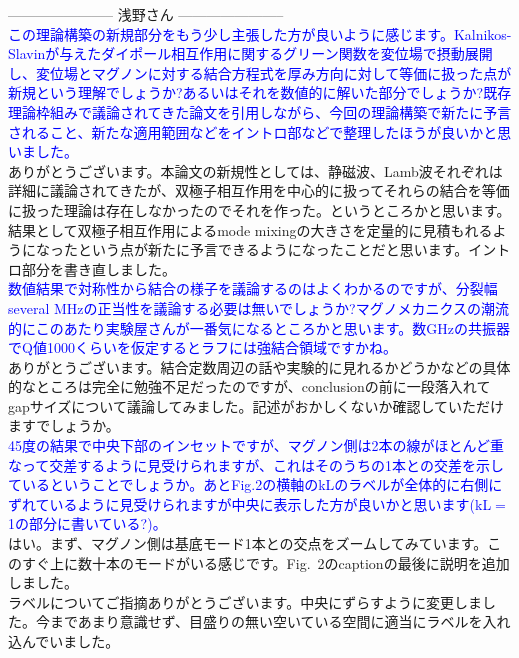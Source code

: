 \documentclass{jsarticle}
\begin{document}
-----------------------
浅野さん
-----------------------\\

\textcolor{blue}{この理論構築の新規部分をもう少し主張した方が良いように感じます。Kalnikos-Slavinが与えたダイポール相互作用に関するグリーン関数を変位場で摂動展開し、変位場とマグノンに対する結合方程式を厚み方向に対して等価に扱った点が新規という理解でしょうか?あるいはそれを数値的に解いた部分でしょうか?既存理論枠組みで議論されてきた論文を引用しながら、今回の理論構築で新たに予言されること、新たな適用範囲などをイントロ部などで整理したほうが良いかと思いました。}\\

ありがとうございます。本論文の新規性としては、静磁波、Lamb波それぞれは詳細に議論されてきたが、双極子相互作用を中心的に扱ってそれらの結合を等価に扱った理論は存在しなかったのでそれを作った。というところかと思います。結果として双極子相互作用によるmode mixingの大きさを定量的に見積もれるようになったという点が新たに予言できるようになったことだと思います。イントロ部分を書き直しました。\\

\textcolor{blue}{数値結果で対称性から結合の様子を議論するのはよくわかるのですが、分裂幅several MHzの正当性を議論する必要は無いでしょうか?マグノメカニクスの潮流的にこのあたり実験屋さんが一番気になるところかと思います。数GHzの共振器でQ値1000くらいを仮定するとラフには強結合領域ですかね。}\\

ありがとうございます。結合定数周辺の話や実験的に見れるかどうかなどの具体的なところは完全に勉強不足だったのですが、conclusionの前に一段落入れてgapサイズについて議論してみました。記述がおかしくないか確認していただけますでしょうか。\\


\textcolor{blue}{45度の結果で中央下部のインセットですが、マグノン側は2本の線がほとんど重なって交差するように見受けられますが、これはそのうちの1本との交差を示しているということでしょうか。あとFig.2の横軸のkLのラベルが全体的に右側にずれているように見受けられますが中央に表示した方が良いかと思います(kL$=$1の部分に書いている?)。}\\

はい。まず、マグノン側は基底モード1本との交点をズームしてみています。このすぐ上に数十本のモードがいる感じです。Fig.~2のcaptionの最後に説明を追加しました。\\

ラベルについてご指摘ありがとうございます。中央にずらすように変更しました。今まであまり意識せず、目盛りの無い空いている空間に適当にラベルを入れ込んでいました。\\
\end{document}
